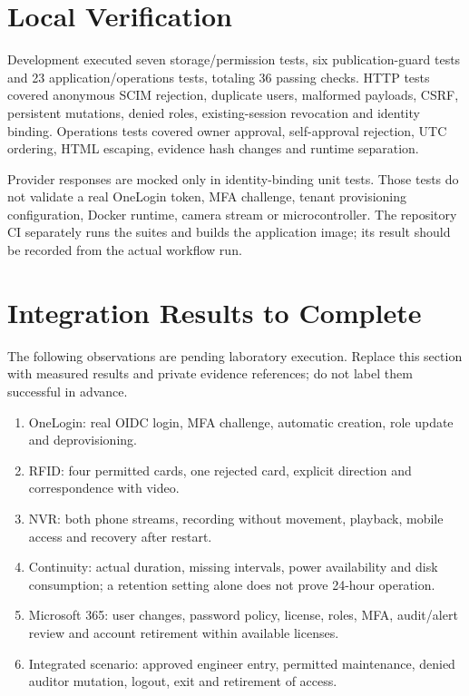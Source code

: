 \documentclass[conference]{IEEEtran}
\begin{document}
\section{Local Verification}
Development executed seven storage/permission tests, six publication-guard tests and 23 application/operations tests, totaling 36 passing checks. HTTP tests covered anonymous SCIM rejection, duplicate users, malformed payloads, CSRF, persistent mutations, denied roles, existing-session revocation and identity binding. Operations tests covered owner approval, self-approval rejection, UTC ordering, HTML escaping, evidence hash changes and runtime separation.

Provider responses are mocked only in identity-binding unit tests. Those tests do not validate a real OneLogin token, MFA challenge, tenant provisioning configuration, Docker runtime, camera stream or microcontroller. The repository CI separately runs the suites and builds the application image; its result should be recorded from the actual workflow run.

\section{Integration Results to Complete}
The following observations are pending laboratory execution. Replace this section with measured results and private evidence references; do not label them successful in advance.
\begin{enumerate}
\item OneLogin: real OIDC login, MFA challenge, automatic creation, role update and deprovisioning.
\item RFID: four permitted cards, one rejected card, explicit direction and correspondence with video.
\item NVR: both phone streams, recording without movement, playback, mobile access and recovery after restart.
\item Continuity: actual duration, missing intervals, power availability and disk consumption; a retention setting alone does not prove 24-hour operation.
\item Microsoft 365: user changes, password policy, license, roles, MFA, audit/alert review and account retirement within available licenses.
\item Integrated scenario: approved engineer entry, permitted maintenance, denied auditor mutation, logout, exit and retirement of access.
\end{enumerate}
\end{document}
